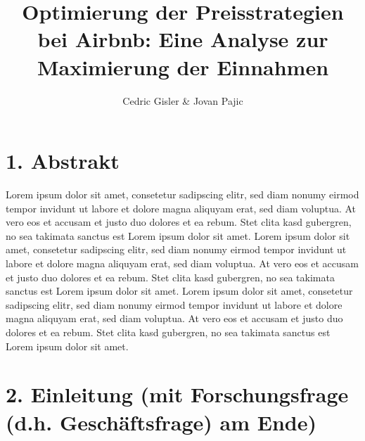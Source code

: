 \documentclass[
  journal,
]{IEEEtran}%
\title{Optimierung der Preisstrategien bei Airbnb: Eine Analyse zur
Maximierung der Einnahmen}
\author{
Cedric Gisler \& Jovan Pajic%

}
\begin{document}


\maketitle


%

\ifdefined\Shaded\renewenvironment{Shaded}{\begin{tcolorbox}[frame hidden, interior hidden, sharp corners, breakable, enhanced, boxrule=0pt, borderline west={3pt}{0pt}{shadecolor}]}{\end{tcolorbox}}\fi

\hypertarget{abstrakt}{%
\section{1. Abstrakt}\label{abstrakt}}

Lorem ipsum dolor sit amet, consetetur sadipscing elitr, sed diam nonumy
eirmod tempor invidunt ut labore et dolore magna aliquyam erat, sed diam
voluptua. At vero eos et accusam et justo duo dolores et ea rebum. Stet
clita kasd gubergren, no sea takimata sanctus est Lorem ipsum dolor sit
amet. Lorem ipsum dolor sit amet, consetetur sadipscing elitr, sed diam
nonumy eirmod tempor invidunt ut labore et dolore magna aliquyam erat,
sed diam voluptua. At vero eos et accusam et justo duo dolores et ea
rebum. Stet clita kasd gubergren, no sea takimata sanctus est Lorem
ipsum dolor sit amet. Lorem ipsum dolor sit amet, consetetur sadipscing
elitr, sed diam nonumy eirmod tempor invidunt ut labore et dolore magna
aliquyam erat, sed diam voluptua. At vero eos et accusam et justo duo
dolores et ea rebum. Stet clita kasd gubergren, no sea takimata sanctus
est Lorem ipsum dolor sit amet.

\hypertarget{einleitung-mit-forschungsfrage-d.h.-geschuxe4ftsfrage-am-ende}{%
\section{2. Einleitung (mit Forschungsfrage (d.h. Geschäftsfrage) am
Ende)}\label{einleitung-mit-forschungsfrage-d.h.-geschuxe4ftsfrage-am-ende}}
\end{document}
